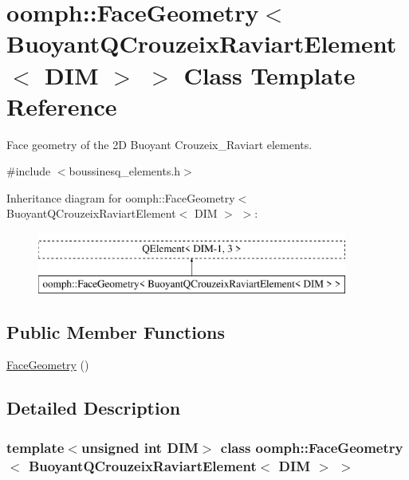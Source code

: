 \hypertarget{classoomph_1_1FaceGeometry_3_01BuoyantQCrouzeixRaviartElement_3_01DIM_01_4_01_4}{}\section{oomph\+:\+:Face\+Geometry$<$ Buoyant\+Q\+Crouzeix\+Raviart\+Element$<$ D\+IM $>$ $>$ Class Template Reference}
\label{classoomph_1_1FaceGeometry_3_01BuoyantQCrouzeixRaviartElement_3_01DIM_01_4_01_4}


Face geometry of the 2D Buoyant Crouzeix\+\_\+\+Raviart elements.  




{\ttfamily \#include $<$boussinesq\+\_\+elements.\+h$>$}

Inheritance diagram for oomph\+:\+:Face\+Geometry$<$ Buoyant\+Q\+Crouzeix\+Raviart\+Element$<$ D\+IM $>$ $>$\+:\begin{figure}[H]
\begin{center}
\leavevmode
\includegraphics[height=2.000000cm]{classoomph_1_1FaceGeometry_3_01BuoyantQCrouzeixRaviartElement_3_01DIM_01_4_01_4}
\end{center}
\end{figure}
\subsection*{Public Member Functions}
\begin{DoxyCompactItemize}
\item 
\hyperlink{classoomph_1_1FaceGeometry_3_01BuoyantQCrouzeixRaviartElement_3_01DIM_01_4_01_4_a3cda0efe7f320d2eee2d7af336fa51fa}{Face\+Geometry} ()
\end{DoxyCompactItemize}


\subsection{Detailed Description}
\subsubsection*{template$<$unsigned int D\+IM$>$\newline
class oomph\+::\+Face\+Geometry$<$ Buoyant\+Q\+Crouzeix\+Raviart\+Element$<$ D\+I\+M $>$ $>$}

